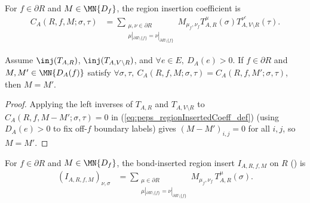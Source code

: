 \begin{definition}%
    \label{def:peps_regionInsertedCoeff}
    \leanok
    For $f\in\partial R$ and $M\in\MN{D_f}$, the region insertion coefficient is
    \begin{align}
        C_A(R,f,M;\sigma,\tau)
         & =
        \sum_{\substack{\mu,\nu\in\partial R \\
                \mu|_{\partial R\setminus\{f\}}
                =\nu|_{\partial R\setminus\{f\}}}}
        M_{\mu_f,\nu_f}
        T_{A,R}^{\mu}(\sigma)
        T_{A,V\setminus R}^{\nu^c}(\tau).
        \label{eq:peps_regionInsertedCoeff_def}
    \end{align}
\end{definition}

\begin{lemma}%
    \label{thm:peps_regionInsertedCoeff_injective}
    \leanok
    Assume $\inj(T_{A,R})$, $\inj(T_{A,V\setminus R})$, and
    $\forall e\in E,\ D_A(e)>0$. If $f\in\partial R$ and $M,M'\in\MN{D_A(f)}$
    satisfy $\forall\sigma,\tau,\ C_A(R,f,M;\sigma,\tau)=C_A(R,f,M';\sigma,\tau)$,
    then $M=M'$.
\end{lemma}
\begin{proof}\leanok
    Applying the left inverses of $T_{A,R}$ and $T_{A,V\setminus R}$ to
    $C_A(R,f,M-M';\sigma,\tau)=0$ in (\ref{eq:peps_regionInsertedCoeff_def})
    (using $D_A(e)>0$ to fix off-$f$ boundary labels) gives $(M-M')_{i,j}=0$
    for all $i,j$, so $M=M'$.
\end{proof}

\begin{definition}%
    \label{def:peps_bond_inserted_region_insert}
    \leanok
    For $f\in\partial R$ and $M\in\MN{D_f}$, the bond-inserted region insert
    $I_{A,R,f,M}$ on $R$ (\cite[Section~3]{Molnar2018NormalPEPS}) is
    \begin{align}
        (I_{A,R,f,M})_{\nu,\sigma}
         & =
        \sum_{\substack{\mu\in\partial R \\
                \mu|_{\partial R\setminus\{f\}}
                =\nu|_{\partial R\setminus\{f\}}}}
        M_{\mu_f,\nu_f}\,T_{A,R}^{\mu}(\sigma).
        \label{eq:peps_bond_inserted_region_insert_def}
    \end{align}
\end{definition}

